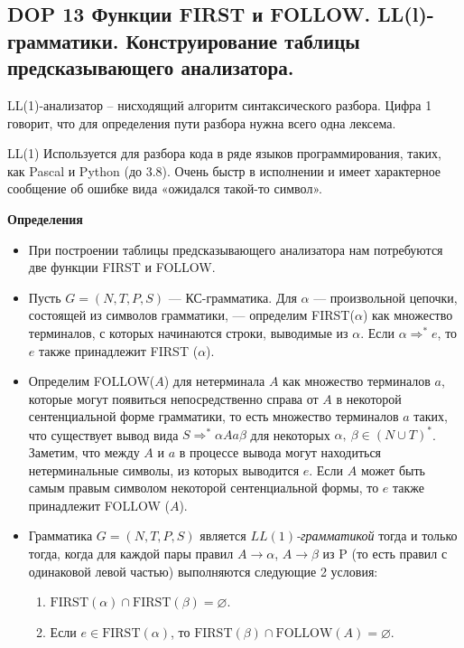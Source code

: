 \subsection{DOP 13 Функции FIRST и FOLLOW. LL(l)-грамматики. Конструирование таблицы предсказывающего анализатора.}

LL(1)-анализатор -- нисходящий алгоритм синтаксического разбора. Цифра 1 говорит, что для определения пути разбора нужна всего одна лексема.

LL(1) Используется для разбора кода в ряде языков программирования, таких, как Pascal и Python (до 3.8). Очень быстр в исполнении и имеет характерное сообщение об ошибке вида «ожидался такой-то символ».

\textbf{Определения}
\begin{itemize}
    \item При построении таблицы предсказывающего анализатора нам потребуются две функции FIRST и FOLLOW.
    \item Пусть $G = (N, T, P, S)$ --- КС-грамматика.
    Для $\alpha$ --- произвольной цепочки, состоящей из символов грамматики, --- определим FIRST($\alpha$) как множество терминалов, с которых начинаются строки, выводимые из $\alpha$.
    Если $\alpha \Rightarrow^\ast e$, то $e$ также принадлежит FIRST ($\alpha$).
    \item Определим FOLLOW($A$) для нетерминала $A$ как множество терминалов $a$, которые могут появиться непосредственно справа от $A$ в некоторой сентенциальной форме грамматики, то есть множество терминалов $a$ таких, что существует вывод вида $S \Rightarrow^\ast \alpha A a \beta$ для некоторых $\alpha,~\beta \in (N \cup T)^\ast$.
    Заметим, что между $A$ и $a$ в процессе вывода могут находиться нетерминальные символы, из которых выводится $e$.
    Если $A$ может быть самым правым символом некоторой сентенциальной формы, то $e$ также принадлежит FOLLOW ($A$).
    \item Грамматика $G = (N, T, P, S)$ является \textit{$LL(1)$-грамматикой} тогда и только тогда, когда для каждой пары правил $A \rightarrow \alpha$, $A \rightarrow \beta$ из P (то есть правил с одинаковой левой частью) выполняются следующие 2 условия:
    \begin{enumerate}
        \item $\text{FIRST}(\alpha) \cap \text{FIRST}(\beta) = \varnothing$.
        \item Если $e \in \text{FIRST}(\alpha)$, то $\text{FIRST}(\beta) \cap \text{FOLLOW}(A) = \varnothing$.
    \end{enumerate}
\end{itemize}

